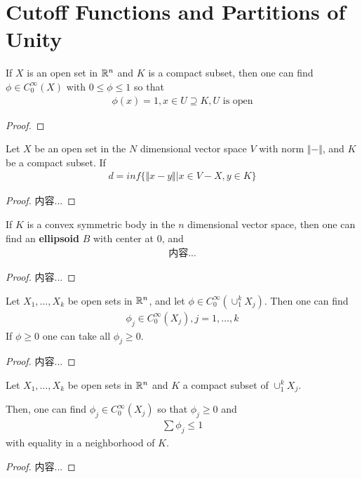 \documentclass[Total.tex]{subfiles}
\begin{document}
		\section{Cutoff Functions and Partitions of Unity}
			\begin{theorem}
				If $X$ is an open set in $\mathbb{R}^n$ and $K$ is a compact subset, then one can find $\phi\in C^\infty_0(X)$ with $0\leq \phi\leq 1$ so that
				\begin{gather*}
					\phi(x)=1,x\in U\supseteq K,U\mbox{ is open}
				\end{gather*}
			\end{theorem}
			\begin{proof}
				
			\end{proof}
			
			\begin{theorem}
				Let $X$ be an open set in the $N$ dimensional vector space $V$ with norm $\Vert-\Vert$, and $K$ be a compact subset. If
				\begin{gather*}
					d=inf\{\Vert x-y\Vert|x\in V-X,y\in K\}
				\end{gather*}
			\end{theorem}
			\begin{proof}
				内容...
			\end{proof}
			
			\begin{lemma}
				If $K$ is a convex symmetric body in the $n$ dimensional vector space, then one can find an \textbf{ellipsoid} $B$ with center at $0$, and
				\begin{gather*}
					内容...
				\end{gather*}
			\end{lemma}
			\begin{proof}
				内容...
			\end{proof}
			
			\begin{theorem}
				Let $X_1,\dots,X_k$ be open sets in $\mathbb{R}^n$, and let $\phi\in C^\infty_0(\cup_{1}^k X_j)$. Then one can find
				\begin{gather*}
					\phi_j\in C_0^\infty(X_j),j=1,\dots,k
				\end{gather*}
				If $\phi\geq 0$ one can take all $\phi_j\geq 0$.
			\end{theorem}
			\begin{proof}
				内容...
			\end{proof}
			
			\begin{theorem}
				Let $X_1,\dots,X_k$ be open sets in $\mathbb{R}^n$ and $K$ a compact subset of $\cup_{1}^k X_j$.
				
				Then, one can find $\phi_j\in C^\infty_0(X_j)$ so that $\phi_j\geq 0$ and 
				\begin{gather*}
					\sum \phi_j\leq 1
				\end{gather*}
				with equality in a neighborhood of $K$.
			\end{theorem}
			\begin{proof}
				内容...
			\end{proof}
			
\end{document}
